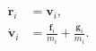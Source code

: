 \documentclass[12pt]{article}
\begin{document}
   \begin{align*}
     \dot{\mathbf r}_i &= \mathbf v_i,  \\
     \dot{\mathbf v}_i &= \frac{\mathbf f_i}{m_i} + \frac{\mathbf g_i}{m_i}.
   \end{align*}
\end{document}
